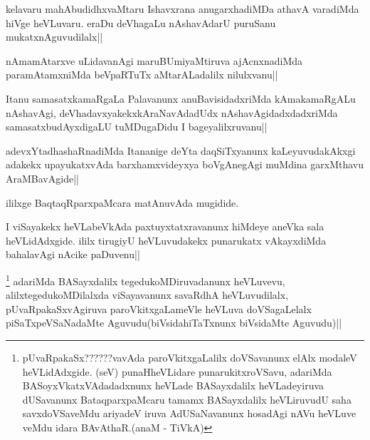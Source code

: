 
\begin{artha}
kelavaru mahAbudidhxvaMtaru Ishavxrana anugarxhadiMDa athavA varadiMda hiVge heVLuvaru. eraDu deVhagaLu nAshavAdarU puruSanu mukatxnAguvudilalx||
\end{artha}


\begin{artha}
nAmamAtarxve uLidavanAgi maruBUmiyaMtiruva ajAcnxnadiMda paramAtamxniMda beVpaRTuTx 
aMtarALadalilx nilulxvanu||
\end{artha}

\begin{artha}
Itanu samasatxkamaRgaLa Palavanunx anuBavisidadxriMda kAmakamaRgALu nAshavAgi, deVhadavxyakekxkAraNavAdadUdx nAshavAgidadxdadxriMda samasatxbudAyxdigaLU tuMDugaDidu  I bageyalilxruvanu||
\end{artha}

\begin{artha}
adevxYtadhashaRnadiMda Itananige deYta daqSiTxyanunx kaLeyuvudakAkxgi adakekx upayukatxvAda barxhamxvideyxya boVgAnegAgi muMdina garxMthavu AraMBavAgide||
\end{artha}

\begin{center}
ililxge BaqtaqRparxpaMcara matAnuvAda mugidide.
\end{center}


\begin{artha}
I viSayakekx heVLabeVkAda paxtuyxtatxravanunx hiMdeye aneVka sala heVLidAdxgide. ililx 
tirugiyU heVLuvudakekx punarukatx vAkayxdiMda bahalavAgi nAcike paDuvenu||
\end{artha}

\begin{artha}
\footnote{pUvaRpakaSx??????vavAda paroVkitxgaLalilx doVSavanunx elAlx modaleV heVLidAdxgide. (seV) punaHheVLidare punarukitxroVSavu, adariMda BASoyxVkatxVAdadadxnunx heVLade BASayxdalilx heVLadeyiruva dUSavanunx BataqparxpaMcaru tamamx BASayxdalilx heVLiruvudU saha savxdoVSaveMdu ariyadeV iruva AdUSaNavanunx hosadAgi nAVu heVLuve veMdu idara BAvAthaR.(anaM - TiVkA)} adariMda BASayxdalilx tegedukoMDiruvadanunx heVLuvevu, alilxtegedukoMDilalxda viSayavanunx savaRdhA heVLuvudilalx, pUvaRpakaSxvAgiruva paroVkitxgaLameVle heVLuva doVSagaLelalx piSaTxpeVSaNadaMte Aguvudu(biVsidahiTaTxnunx biVsidaMte Aguvudu)||
\end{artha}

